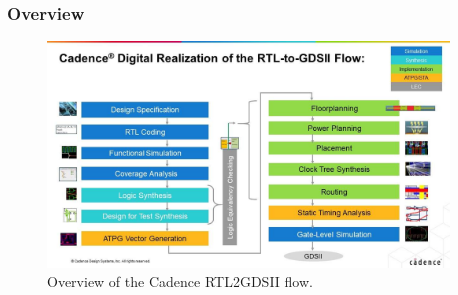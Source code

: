 \documentclass{beamer}
\begin{document}
\begin{frame}
\frametitle{Overview}


\begin{figure}
\centering
    \includegraphics[width=0.95\textwidth]{overview.jpg}
    \caption{Overview of the Cadence RTL2GDSII flow.}
    \label{fig:overview}
\end{figure}

\end{frame}
\end{document}
